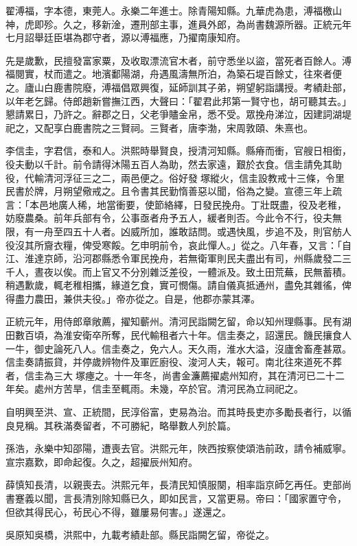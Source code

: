 \begin{pinyinscope}
翟溥福，字本德，東莞人。永樂二年進士。除青陽知縣。九華虎為患，溥福檄山神，虎即殄。久之，移新淦，遷刑部主事，進員外郎，為尚書魏源所器。正統元年七月詔舉廷臣堪為郡守者，源以溥福應，乃擢南康知府。

先是歲歉，民擅發富家粟，及收取漂流官木者，前守悉坐以盜，當死者百餘人。溥福閱實，杖而遣之。地濱鄱陽湖，舟遇風濤無所泊，為築石堤百餘丈，往來者便之。廬山白鹿書院廢，溥福倡眾興復，延師訓其子弟，朔望躬詣講授。考績赴部，以年老乞歸。侍郎趙新嘗撫江西，大聲曰：「翟君此邦第一賢守也，胡可聽其去。」懇請累日，乃許之。辭郡之日，父老爭贐金帛，悉不受。眾挽舟涕泣，因建詞湖堤祀之，又配享白鹿書院之三賢祠。三賢者，唐李渤，宋周敦頤、朱熹也。

李信圭，字君信，泰和人。洪熙時舉賢良，授清河知縣。縣瘠而衝，官艘日相銜，役夫動以千計。前令請得沐陽五百人為助，然去家遠，艱於衣食。信圭請免其助役，代輸清河浮征三之二，兩邑便之。俗好發塚縱火，信圭設教戒十三條，令里民書於牌，月朔望儆戒之。且令書其民勤惰善惡以聞，俗為之變。宣德三年上疏言：「本邑地廣人稀，地當衝要，使節絡繹，日發民挽舟。丁壯既盡，役及老稚，妨廢農桑。前年兵部有令，公事亟者舟予五人，緩者則否。今此令不行，役夫無限，有一舟至四五十人者。凶威所加，誰敢詰問。或遇快風，步追不及，則官舫人役沒其所齎衣糧，俾受寒餒。乞申明前令，哀此憚人。」從之。八年春，又言：「自江、淮達京師，沿河郡縣悉令軍民挽舟，若無衛軍則民夫盡出有司，州縣歲發二三千人，晝夜以俟。而上官又不分別雜泛差役，一體派及。致土田荒蕪，民無蓄積。稍遇歉歲，輒老稚相攜，緣道乞食，實可憫傷。請自儀真抵通州，盡免其雜徭，俾得盡力農田，兼供夫役。」帝亦從之。自是，他郡亦蒙其澤。

正統元年，用侍郎章敞薦，擢知蘄州。清河民詣闕乞留，命以知州理縣事。民有湖田數百頃，為淮安衛卒所奪，民代輸租者六十年。信圭奏之，詔還民。饑民攘食人一牛，御史論死八人。信圭奏之，免六人。天久雨，淮水大溢，沒廬舍畜產甚眾。信圭奏請振貸，并停歲辨物件及軍匠廚役、浚河人夫，報可。南北往來道死不葬者，信圭為三大塚瘞之。十一年冬，尚書金濂薦擢處州知府，其在清河已二十二年矣。處州方苦旱，信圭至輒雨。未幾，卒於官。清河民為立祠祀之。

自明興至洪、宣、正統間，民淳俗富，吏易為治。而其時長吏亦多勵長者行，以循良見稱。其秩滿奏留者，不可勝紀，略舉數人列於篇。

孫浩，永樂中知邵陽，遭喪去官。洪熙元年，陜西按察使頌浩前政，請令補威寧。宣宗嘉歎，即命起復。久之，超擢辰州知府。

薛慎知長清，以親喪去。洪熙元年，長清民知慎服闋，相率詣京師乞再任。吏部尚書蹇義以聞，言長清別除知縣已久，即如民言，又當更易。帝曰：「國家置守令，但欲其得民心，茍民心不得，雖屢易何害。」遂還之。

吳原知吳橋，洪熙中，九載考績赴部。縣民詣闕乞留，帝從之。


\end{pinyinscope}
